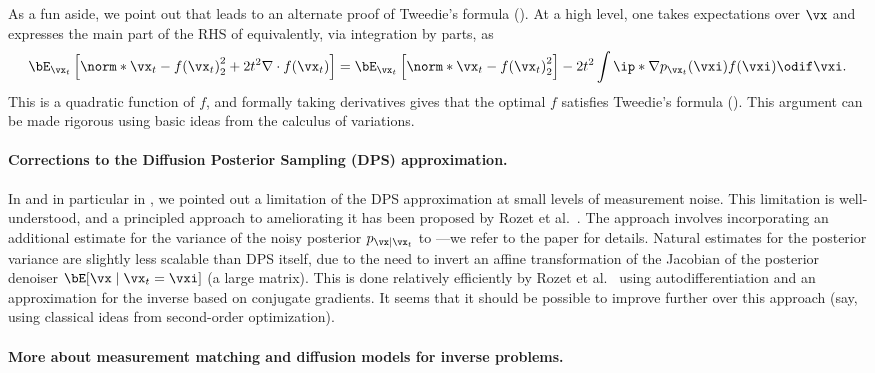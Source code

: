\documentclass[../../book-main.tex]{subfiles}
\begin{document}
As a fun aside, we point out that  leads to an alternate
proof of Tweedie's formula (). At a high level, one takes
expectations over $\vx$ and expresses the main part of the RHS of
 equivalently, via integration by parts, as
\begin{equation}
  \bE_{\vx_t}\left[
    \norm*{\vx_t - f(\vx_t)}_2^2
    + 2t^2 \nabla \cdot f(\vx_t)
    \right]
  =
  \bE_{\vx_t}\left[
    \norm*{\vx_t - f(\vx_t)}_2^2
    \right]
  - 2t^2 \int
  \ip*{\nabla p_{\vx_t}(\vxi)}{f(\vxi)}
  \odif \vxi.
\end{equation}
This is a quadratic function of $f$, and formally taking derivatives gives
that the optimal $f$ satisfies Tweedie's formula (). This
argument can be made rigorous using basic ideas from the calculus of variations.


\paragraph{Corrections to the Diffusion Posterior Sampling (DPS) approximation.}
In  and in particular in
, we pointed out
a limitation of the DPS approximation
 at
small levels of measurement noise. 
This limitation is well-understood, and a principled approach to ameliorating it
has been proposed by Rozet et al.\ \cite{rozet2024learning}.
The approach involves incorporating an additional estimate for the variance of
the noisy posterior $p_{\vx \mid \vx_t}$ to
---we
refer to the paper for details.
Natural estimates for the posterior variance are slightly less scalable than DPS
itself, due to the need to invert an affine transformation of the Jacobian of
the posterior denoiser $\bE[\vx \mid \vx_t=\vxi]$ (a large matrix). This is done
relatively efficiently by Rozet et al.\ \cite{rozet2024learning} using autodifferentiation and an
approximation for the inverse based on conjugate gradients. It seems that it
should be possible to improve further over this approach (say, using classical
ideas from second-order optimization).


\paragraph{More about measurement matching and diffusion models for inverse
problems.} 
\end{document}
